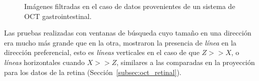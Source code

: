 \begin{figure}[ht!]
	\centering
	\caption[Imágenes del esófago filtradas]{Imágenes filtradas en el caso de datos provenientes de un sistema de OCT gastrointestinal.}
	\label{fig:gastrointestinal}
\end{figure}

Las pruebas realizadas con ventanas de búsqueda cuyo tamaño en una dirección era mucho más grande que en la otra, mostraron la presencia de \textit{línea} en la dirección preferencial, esto es \textit{líneas} verticales en el caso de que $Z>>X$, o \textit{líneas} horizontales cuando $X>>Z$, similares a las comparadas en la proyección \enface para los datos de la retina (Sección~\ref{subsec:oct_retinal}).


